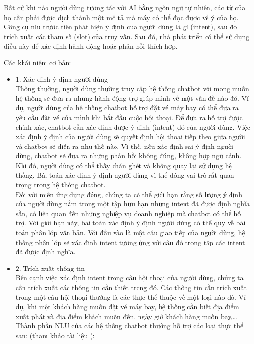 Bất cứ khi nào người dùng tương tác với AI bằng ngôn ngữ tự nhiên, các từ của họ cần phải được dịch thành một mô tả mà máy có thể đọc được về ý của họ.
Công cụ \ac{nlu} trước tiên phát hiện ý định của người dùng là gì (intent), sau đó trích xuất các tham số (slot) của truy vấn. Sau đó, nhà phát triển có thể sử dụng điều này để xác định hành động hoặc phản hồi thích hợp.

Các khái niệm cơ bản:
\begin{itemize}
    \item 1. Xác định ý định người dùng
          \\
          Thông thường, người dùng thường truy cập hệ thống chatbot với mong muốn hệ thống sẽ đưa ra những hành động trợ giúp mình về một vấn đề nào đó. Ví dụ, người dùng của hệ thống chatbot hỗ trợ đặt vé máy bay có thể đưa ra yêu cầu đặt vé của mình khi bắt đầu cuộc hội thoại. Để đưa ra hỗ trợ được chính xác, chatbot cần xác định được ý định (intent) đó của người dùng. Việc xác định ý định của người dùng sẽ quyết định hội thoại tiếp theo giữa người và chatbot sẽ diễn ra như thế nào. Vì thế, nếu xác định sai ý định người dùng, chatbot sẽ đưa ra những phản hồi không đúng, không hợp ngữ cảnh. Khi đó, người dùng có thể thấy chán ghét và không quay lại sử dụng hệ thống. Bài toán xác định ý định người dùng vì thế đóng vai trò rất quan trọng trong hệ thống chatbot.
          \\
          Đối với miền ứng dụng đóng, chúng ta có thể giới hạn rằng số lượng ý định của người dùng nằm trong một tập hữu hạn những intent đã được định nghĩa sẵn, có liên quan đến những nghiệp vụ doanh nghiệp mà chatbot có thể hỗ trợ. Với giới hạn này, bài toán xác định ý định người dùng có thể quy về bài toán phân lớp văn bản. Với đầu vào là một câu giao tiếp của người dùng, hệ thống phân lớp sẽ xác định intent tương ứng với câu đó trong tập các intent đã được định nghĩa.
    \item 2. Trích xuất thông tin
          \\
          Bên cạnh việc xác định intent trong câu hội thoại của người dùng, chúng ta cần trích xuất các thông tin cần thiết trong đó. Các thông tin cần trích xuất trong một câu hội thoại thường là các thực thể thuộc về một loại nào đó. Ví dụ, khi một khách hàng muốn đặt vé máy bay, hệ thống cần biết địa điểm xuất phát và địa điểm khách muốn đến, ngày giờ khách hàng muốn bay,…Thành phần NLU của các hệ thống chatbot thường hỗ trợ các loại thực thể sau:  (tham khảo tài liệu \cite{1} ): 
          

\end{itemize}
